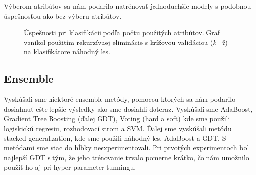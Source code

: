 \documentclass[runningheads]{llncs}
\begin{document}
Výberom atribútov sa nám podarilo natrénovať jednoduchšie modely s podobnou úspešnosťou ako bez výberu atribútov.

\begin{figure}%
    \centering
    \qquad
    \caption{Úspešnosti pri klasifikácii podľa počtu použitých atribútov. Graf vznikol použitím rekurzívnej eliminácie s krížovou validáciou (\textit{k=2}) na klasifikátore náhodný les.}%
    \label{fig:feature_selection_classification_position}%
\end{figure}

\subsection{Ensemble}

Vyskúšali sme niektoré ensemble metódy, pomocou ktorých sa nám podarilo dosiahnuť ešte lepšie výsledky ako sme dosiahli doteraz. Vyskúšali sme AdaBoost, Gradient Tree Boosting (ďalej GDT), Voting (hard a soft) kde sme použili logiskickú regresiu, rozhodovací strom a SVM. Ďalej sme vyskúšali metódu stacked generalization, kde sme použili náhodný les, AdaBoost a GDT. S metódami sme viac do hĺbky neexperimentovali. Pri prvotých experimentoch bol najlepší GDT s tým, že jeho trénovanie trvalo pomerne krátko, čo nám umožnilo použiť ho aj pri hyper-parameter tunningu.
\end{document}
